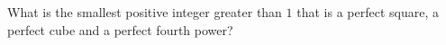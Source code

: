 What is the smallest positive integer greater than $1$ that is a perfect square, a perfect cube and a perfect fourth power?
